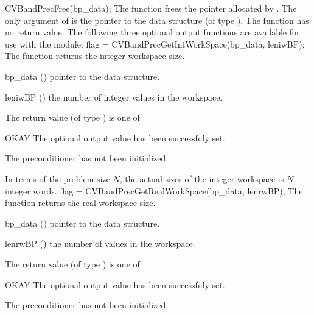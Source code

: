 {}
{
  CVBandPrecFree(bp\_data);
}
{
  The function  frees the pointer allocated by
  .
}
{
  The only argument of  is the pointer to the {\cvbandpre} 
  data structure (of type ).
}
{
  The function  has no return value.
}
{}
The following three optional output functions are available for use with 
the {\cvbandpre} module:
{
  flag = CVBandPrecGetIntWorkSpace(bp\_data, leniwBP);
}
{
  The function  returns the
  {\cvbandpre} integer workspace size.
}
{
  \begin{args}[leniwBP]
  \item[bp\_data] ()
    pointer to the {\cvbandpre} data structure.
  \item[leniwBP] ()
    the number of integer values in the {\cvbandpre} workspace.
  \end{args}
}
{
  The return value  (of type ) is one of
  \begin{args}[BP\_NO\_DATA]
  \item[OKAY] 
    The optional output value has been successfuly set.
  \item[\Id{BP\_NO\_DATA}]
    The {\cvbandpre} preconditioner has not been initialized.
  \end{args}
}
{
  In terms of the problem size $N$, the actual sizes of the integer workspace
  is $N$ integer words.
}
{
  flag = CVBandPrecGetRealWorkSpace(bp\_data, lenrwBP);
}
{
  The function  returns the
  {\cvbandpre} real workspace size.
}
{
  \begin{args}[lenrwBP]
  \item[bp\_data] ()
    pointer to the {\cvbandpre} data structure.
  \item[lenrwBP] ()
    the number of  values in the {\cvbandpre} workspace.
  \end{args}
}
{
  The return value  (of type ) is one of
  \begin{args}[BP\_NO\_DATA]
  \item[OKAY] 
    The optional output value has been successfuly set.
  \item[\Id{BP\_NO\_DATA}]
    The {\cvbandpre} preconditioner has not been initialized.
  \end{args}
}

